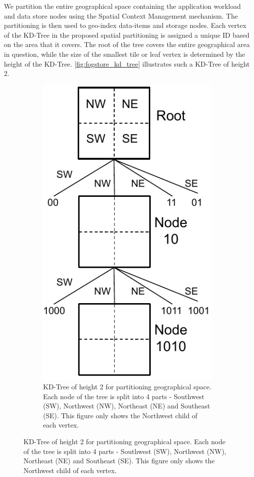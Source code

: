 We partition the entire geographical space containing the application workload and data store nodes using the Spatial Context Management mechanism. The partitioning is then used to geo-index data-items and storage nodes. Each vertex of the KD-Tree in the proposed spatial partitioning is assigned a unique ID based on the area that it covers. The root of the tree covers the entire geographical area in question, while the size of the smallest tile or leaf vertex is determined by the height of the KD-Tree. \cref{fig:fogstore_kd_tree} illustrates such a KD-Tree of height 2. 
\begin{figure}[ht]
  \centering
  \begin{subfigure}[b]{0.45\linewidth}
    \centering
    \includegraphics[width=0.75\linewidth]{figures/fogstore/kdtree.pdf}
    \caption{KD-Tree of height 2 for partitioning geographical space. Each node of the tree is split into 4 parts - Southwest (SW), Northwest (NW), Northeast (NE) and Southeast (SE). This figure only shows the Northwest child of each vertex.}

\end{subfigure}
\end{figure}
